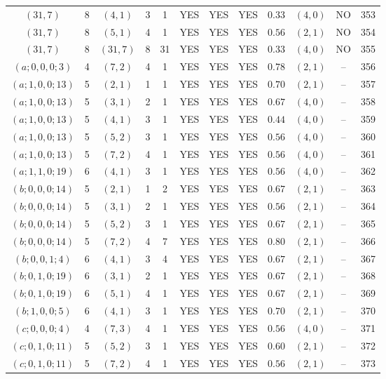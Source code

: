 \begin{longtable}{|c|c|c|c|c|c|c|c|c|c|c|c|}
$(31,7)$ & 8 & $(4,1)$ & 3 & 1 & YES & YES & YES & $0.33$ & $(4,0)$ & NO & 353\\
$(31,7)$ & 8 & $(5,1)$ & 4 & 1 & YES & YES & YES & $0.56$ & $(2,1)$ & NO & 354\\
$(31,7)$ & 8 & $(31,7)$ & 8 & 31 & YES & YES & YES & $0.33$ & $(4,0)$ & NO & 355\\
$(a;0,0,0;3)$ & 4 & $(7,2)$ & 4 & 1 & YES & YES & YES & $0.78$ & $(2,1)$ & -- & 356\\
$(a;1,0,0;13)$ & 5 & $(2,1)$ & 1 & 1 & YES & YES & YES & $0.70$ & $(2,1)$ & -- & 357\\
$(a;1,0,0;13)$ & 5 & $(3,1)$ & 2 & 1 & YES & YES & YES & $0.67$ & $(4,0)$ & -- & 358\\
$(a;1,0,0;13)$ & 5 & $(4,1)$ & 3 & 1 & YES & YES & YES & $0.44$ & $(4,0)$ & -- & 359\\
$(a;1,0,0;13)$ & 5 & $(5,2)$ & 3 & 1 & YES & YES & YES & $0.56$ & $(4,0)$ & -- & 360\\
$(a;1,0,0;13)$ & 5 & $(7,2)$ & 4 & 1 & YES & YES & YES & $0.56$ & $(4,0)$ & -- & 361\\
$(a;1,1,0;19)$ & 6 & $(4,1)$ & 3 & 1 & YES & YES & YES & $0.56$ & $(4,0)$ & -- & 362\\
$(b;0,0,0;14)$ & 5 & $(2,1)$ & 1 & 2 & YES & YES & YES & $0.67$ & $(2,1)$ & -- & 363\\
$(b;0,0,0;14)$ & 5 & $(3,1)$ & 2 & 1 & YES & YES & YES & $0.56$ & $(2,1)$ & -- & 364\\
$(b;0,0,0;14)$ & 5 & $(5,2)$ & 3 & 1 & YES & YES & YES & $0.67$ & $(2,1)$ & -- & 365\\
$(b;0,0,0;14)$ & 5 & $(7,2)$ & 4 & 7 & YES & YES & YES & $0.80$ & $(2,1)$ & -- & 366\\
$(b;0,0,1;4)$ & 6 & $(4,1)$ & 3 & 4 & YES & YES & YES & $0.67$ & $(2,1)$ & -- & 367\\
$(b;0,1,0;19)$ & 6 & $(3,1)$ & 2 & 1 & YES & YES & YES & $0.67$ & $(2,1)$ & -- & 368\\
$(b;0,1,0;19)$ & 6 & $(5,1)$ & 4 & 1 & YES & YES & YES & $0.67$ & $(2,1)$ & -- & 369\\
$(b;1,0,0;5)$ & 6 & $(4,1)$ & 3 & 1 & YES & YES & YES & $0.70$ & $(2,1)$ & -- & 370\\
$(c;0,0,0;4)$ & 4 & $(7,3)$ & 4 & 1 & YES & YES & YES & $0.56$ & $(4,0)$ & -- & 371\\
$(c;0,1,0;11)$ & 5 & $(5,2)$ & 3 & 1 & YES & YES & YES & $0.60$ & $(2,1)$ & -- & 372\\
$(c;0,1,0;11)$ & 5 & $(7,2)$ & 4 & 1 & YES & YES & YES & $0.56$ & $(2,1)$ & -- & 373\\

\end{longtable}
